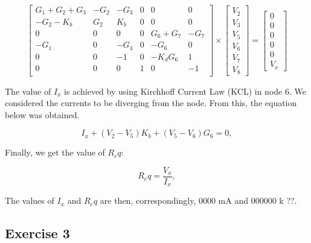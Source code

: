 \begin{equation}
\left[ \begin{array}{cccccc} 
		G_1+G_2+G_3 & -G_2 & -G_3 & 0 & 0 & 0 \\
		-G_2-K_b & G_2 & K_b & 0 & 0 & 0 \\ 
		0 & 0 & 0 & 0 & G_6+G_7 & -G_7  \\ 
		-G_1 & 0 & -G_4 & 0 & -G_6 & 0  \\ 
		0 & 0 & -1 & 0 & -K_dG_6 & 1 \\ 
		0 & 0 & 0 & 1 & 0 & -1 \\ 
\end{array} \right]
\times \left[ \begin{array}{c} V_2 \\ V_3 \\  V_5 \\ V_6 \\ V_7 \\ V_8 \end{array} \right] =
\left[ \begin{array}{c} 0 \\ 0 \\ 0 \\ 0 \\ 0 \\ V_x  \end{array} \right]
\label{eq:nodalmatrix2}
\end{equation}

The value of $I_x$ is achieved by using Kirchhoff Current Law (KCL) in node 6. We considered the currents to be diverging from the node. From this, the equation below was obtained.

\begin{equation}
  I_{x} + (V_{2} - V_{5})K_{b} + (V_{5} - V_{6})G_{6} = 0,
  \label{eq:ix2}
\end{equation}

Finally, we get the value of $R_eq$:

\begin{equation}
  R_eq = \frac{V_x}{I_x},
  \label{eq:ohm14}
\end{equation}

The values of $I_x$ and $R_eq$ are then, correspondingly, 0000 mA and 000000 k ??.


\subsection{Exercise 3}
\label{sec:exercise3}





